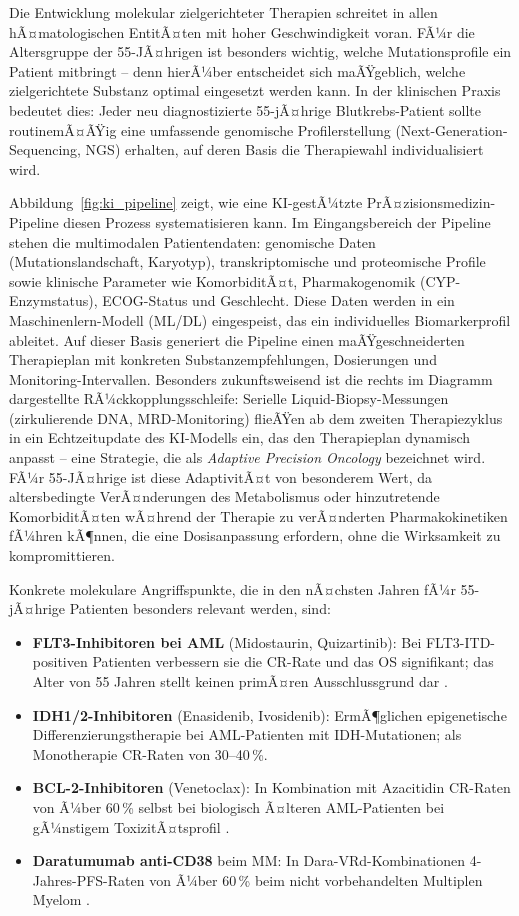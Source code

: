 ﻿\documentclass[12pt,a4paper]{article}
\theoremstyle{definition}
\begin{document}
Die Entwicklung molekular zielgerichteter Therapien schreitet in allen hÃ¤matologischen
EntitÃ¤ten mit hoher Geschwindigkeit voran. FÃ¼r die Altersgruppe der 55-JÃ¤hrigen ist
besonders wichtig, welche Mutationsprofile ein Patient mitbringt -- denn hierÃ¼ber
entscheidet sich maÃŸgeblich, welche zielgerichtete Substanz optimal eingesetzt werden
kann. In der klinischen Praxis bedeutet dies: Jeder neu diagnostizierte 55-jÃ¤hrige
Blutkrebs-Patient sollte routinemÃ¤ÃŸig eine umfassende genomische Profilerstellung
(Next-Generation-Sequencing, NGS) erhalten, auf deren Basis die Therapiewahl
individualisiert wird.

Abbildung~\ref{fig:ki_pipeline} zeigt, wie eine KI-gestÃ¼tzte PrÃ¤zisionsmedizin-Pipeline
diesen Prozess systematisieren kann. Im Eingangsbereich der Pipeline stehen die
multimodalen Patientendaten: genomische Daten (Mutationslandschaft, Karyotyp),
transkriptomische und proteomische Profile sowie klinische Parameter wie KomorbiditÃ¤t,
Pharmakogenomik (CYP-Enzymstatus), ECOG-Status und Geschlecht. Diese Daten werden
in ein Maschinenlern-Modell (ML/DL) eingespeist, das ein individuelles Biomarkerprofil
ableitet. Auf dieser Basis generiert die Pipeline einen maÃŸgeschneiderten Therapieplan
mit konkreten Substanzempfehlungen, Dosierungen und Monitoring-Intervallen. Besonders
zukunftsweisend ist die rechts im Diagramm dargestellte RÃ¼ckkopplungsschleife: Serielle
Liquid-Biopsy-Messungen (zirkulierende DNA, MRD-Monitoring) flieÃŸen ab dem zweiten
Therapiezyklus in ein Echtzeitupdate des KI-Modells ein, das den Therapieplan dynamisch
anpasst -- eine Strategie, die als \emph{Adaptive Precision Oncology} bezeichnet wird.
FÃ¼r 55-JÃ¤hrige ist diese AdaptivitÃ¤t von besonderem Wert, da altersbedingte VerÃ¤nderungen
des Metabolismus oder hinzutretende KomorbiditÃ¤ten wÃ¤hrend der Therapie zu verÃ¤nderten
Pharmakokinetiken fÃ¼hren kÃ¶nnen, die eine Dosisanpassung erfordern, ohne die Wirksamkeit
zu kompromittieren.

Konkrete molekulare Angriffspunkte, die in den nÃ¤chsten Jahren fÃ¼r 55-jÃ¤hrige Patienten
besonders relevant werden, sind:
\begin{itemize}
  \item \textbf{FLT3-Inhibitoren bei AML} (Midostaurin, Quizartinib): Bei
        FLT3-ITD-positiven Patienten verbessern sie die CR-Rate und das OS signifikant;
        das Alter von 55 Jahren stellt keinen primÃ¤ren Ausschlussgrund dar
        \cite{dohner2017}.
  \item \textbf{IDH1/2-Inhibitoren} (Enasidenib, Ivosidenib): ErmÃ¶glichen
        epigenetische Differenzierungstherapie bei AML-Patienten mit IDH-Mutationen;
        als Monotherapie CR-Raten von 30--40\,\%.
  \item \textbf{BCL-2-Inhibitoren} (Venetoclax): In Kombination mit Azacitidin
        CR-Raten von Ã¼ber 60\,\% selbst bei biologisch Ã¤lteren AML-Patienten bei
        gÃ¼nstigem ToxizitÃ¤tsprofil \cite{fenaux2009}.
  \item \textbf{Daratumumab anti-CD38} beim MM: In Dara-VRd-Kombinationen
        4-Jahres-PFS-Raten von Ã¼ber 60\,\% beim nicht vorbehandelten Multiplen
        Myelom \cite{kumar2017}.
\end{itemize}
\end{document}
